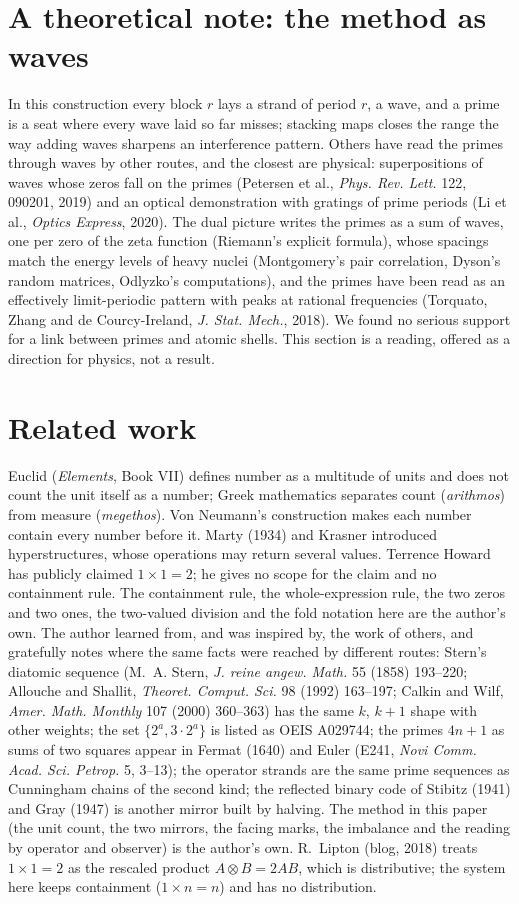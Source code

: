 \documentclass[11pt]{article}
\begin{document}
\section{A theoretical note: the method as waves}
In this construction every block $r$ lays a strand of period $r$, a wave, and a prime is a seat where every wave laid so far misses; stacking maps closes the range the way adding waves sharpens an interference pattern. Others have read the primes through waves by other routes, and the closest are physical: superpositions of waves whose zeros fall on the primes (Petersen et al., \emph{Phys. Rev. Lett.} 122, 090201, 2019) and an optical demonstration with gratings of prime periods (Li et al., \emph{Optics Express}, 2020). The dual picture writes the primes as a sum of waves, one per zero of the zeta function (Riemann's explicit formula), whose spacings match the energy levels of heavy nuclei (Montgomery's pair correlation, Dyson's random matrices, Odlyzko's computations), and the primes have been read as an effectively limit-periodic pattern with peaks at rational frequencies (Torquato, Zhang and de Courcy-Ireland, \emph{J. Stat. Mech.}, 2018). We found no serious support for a link between primes and atomic shells. This section is a reading, offered as a direction for physics, not a result.

\section{Related work}
Euclid (\emph{Elements}, Book VII) defines number as a multitude of units and does not count the unit itself as a number; Greek mathematics separates count (\emph{arithmos}) from measure (\emph{megethos}). Von Neumann's construction makes each number contain every number before it. Marty (1934) and Krasner introduced hyperstructures, whose operations may return several values. Terrence Howard has publicly claimed $1\times1 = 2$; he gives no scope for the claim and no containment rule. The containment rule, the whole-expression rule, the two zeros and two ones, the two-valued division and the fold notation here are the author's own. The author learned from, and was inspired by, the work of others, and gratefully notes where the same facts were reached by different routes: Stern's diatomic sequence (M.~A. Stern, \emph{J. reine angew. Math.} 55 (1858) 193--220; Allouche and Shallit, \emph{Theoret. Comput. Sci.} 98 (1992) 163--197; Calkin and Wilf, \emph{Amer. Math. Monthly} 107 (2000) 360--363) has the same $k$, $k+1$ shape with other weights; the set $\{2^a, 3\cdot2^a\}$ is listed as OEIS A029744; the primes $4n+1$ as sums of two squares appear in Fermat (1640) and Euler (E241, \emph{Novi Comm. Acad. Sci. Petrop.} 5, 3--13); the operator strands are the same prime sequences as Cunningham chains of the second kind; the reflected binary code of Stibitz (1941) and Gray (1947) is another mirror built by halving. The method in this paper (the unit count, the two mirrors, the facing marks, the imbalance and the reading by operator and observer) is the author's own. R.~Lipton (blog, 2018) treats $1\times1=2$ as the rescaled product $A\otimes B = 2AB$, which is distributive; the system here keeps containment ($1\times n = n$) and has no distribution.
\end{document}
